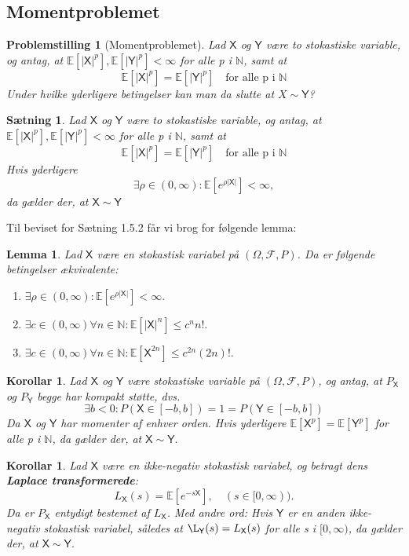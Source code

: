 \documentclass{article}
\newcommand{\N}{\mathbb{N}}
\newcommand{\E}{\mathbb{E}}
\newcommand{\1}{\mathbbm{1}}
\newcommand{\X}{\mathsf{X}}
\newcommand{\Y}{\mathsf{Y}}
\newcommand{\pfield}{(\Omega, \mathcal{F}, P)}
\newtheorem{lemma}[theorem]{Lemma}
\newtheorem{corollary}[theorem]{Korollar}
\newtheorem{proposition}[theorem]{Sætning}
\newtheorem{problemstilling}[theorem]{Problemstilling}
\theoremstyle{boxed}
\begin{document}
\subsection{Momentproblemet}
\begin{theorem-box}
    \begin{problemstilling}[Momentproblemet]
        Lad $\X$ og $\Y$ være to stokastiske variable, og antag, at $\E[|\X|^p], \E[|\Y|^p]<\infty$ for alle p i $\N$, samt at
        $$\E[|\X|^p]=\E[|\Y|^p] \quad \text{for alle p i }\N$$
        Under hvilke yderligere betingelser kan man da slutte at $X\sim\Y$?
    \end{problemstilling}
\end{theorem-box}
\begin{theorem-box}
    \begin{proposition}
        Lad $\X$ og $\Y$ være to stokastiske variable, og antag, at $\E[|\X|^p], \E[|\Y|^p]<\infty$ for alle p i $\N$, samt at
        $$\E[|\X|^p]=\E[|\Y|^p] \quad \text{for alle p i }\N$$
        Hvis yderligere 
        $$\exists\rho\in(0,\infty):\E[e^{\rho|\X|}]<\infty,$$
        da gælder der, at $\X\sim\Y$
    \end{proposition}
\end{theorem-box}
Til beviset for Sætning 1.5.2 får vi brog for følgende lemma:
\begin{theorem-box}
    \begin{lemma}
        Lad $\X$ være en stokastisk variabel på $\pfield$. Da er følgende betingelser ækvivalente:
        \begin{enumerate}
            \item[\textnormal{(i)}] $\exists\rho\in(0,\infty):\E[e^{\rho|\X|}]<\infty.$
            \item[\textnormal{(ii)}] $\exists c\in(0,\infty)\forall n\in\N:\E[|\X|^n]\leq c^nn!.$ 
            \item[\textnormal{(iii)}] $\exists c\in(0,\infty)\forall n\in\N:\E[\X^{2n}]\leq c^{2n}(2n)!.$ 
        \end{enumerate}
    \end{lemma}
\end{theorem-box}
\begin{theorem-box}
    \begin{corollary}
        Lad $\X$ og $\Y$ være stokastiske variable på $\pfield$, og antag, at $P_\X$ og $P_\Y$ begge har kompakt støtte, dvs.
        $$\exists b<0:P(\X\in[-b,b])=1=P(\Y\in[-b,b])$$
        Da $\X$ og $\Y$ har momenter af enhver orden. Hvis yderligere $\E[\X^p]=\E[\Y^p]$ for alle p i $\N$, da gælder der, at $\X\sim\Y.$
    \end{corollary}
\end{theorem-box}
\begin{theorem-box}
    \begin{corollary}
        Lad $\X$ være en ikke-negativ stokastisk variabel, og betragt dens \textbf{Laplace transformerede}:
        $$L_\X(s)=\E[e^{-s\X}],\quad (s\in[0,\infty)).$$
        Da er $P_\X$ entydigt bestemet af $L_\X$. Med andre ord: Hvis $\Y$ er en anden ikke-negativ stokastisk variabel, således at $\L_\Y(s)=L_\X(s)$ for alle s i $[0,\infty)$, da gælder der, at $\X\sim\Y.$
    \end{corollary}
\end{theorem-box}
\end{document}
